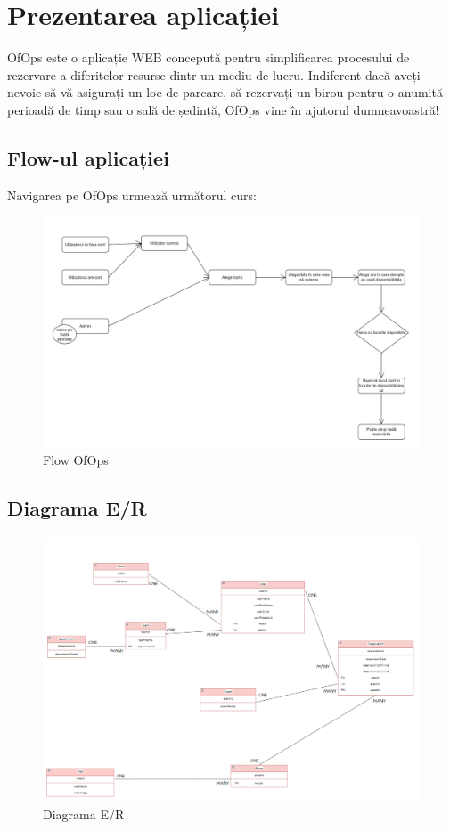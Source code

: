 \chapter{Prezentarea aplicației}

OfOps este o aplicație WEB concepută pentru simplificarea procesului de rezervare a diferitelor resurse dintr-un mediu de lucru. Indiferent dacă aveți nevoie să vă asigurați un loc de parcare, să rezervați un birou pentru o anumită perioadă de timp sau o sală de ședință, OfOps vine în ajutorul dumneavoastră!

\section{Flow-ul aplicației}

Navigarea pe OfOps urmează următorul curs:

\begin{figure}[!htb]
    \centering
    \includegraphics[width=0.9\linewidth]{images/flow.png}
    \caption{Flow OfOps}
    \label{fig:flow}
\end{figure}

\newpage

\section{Diagrama E/R}

\begin{figure}[!htb]
    \centering
    \includegraphics[width=0.9\linewidth]{images/diagrama.png}
    \caption{Diagrama E/R}
    \label{fig:diagrama}
\end{figure}

